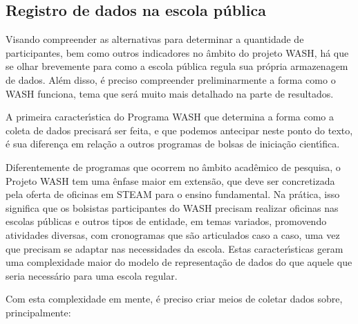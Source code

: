 \documentclass[
12pt,		%
openright,	%
twoside,  %
a4paper,			%
chapter=TITLE,		%
english,			%
french,				%
spanish,			%
brazil				%
]{USPSC-classe/USPSC}
\begin{document}
\subsection[Registro de dados na escola p\'ublica]{Registro de dados na escola p\'ublica}\label{Registro de dados na escola p\'ublica}
Visando compreender as alternativas para determinar a quantidade de participantes, bem como outros indicadores no \^ambito do projeto WASH, h\'a que se olhar brevemente para como a escola p\'ublica regula sua pr\'opria armazenagem de dados. Al\'em disso, \'e preciso compreender preliminarmente a forma como o WASH funciona, tema que ser\'a muito mais detalhado na parte de resultados.










A primeira caracter\'{\i}stica do Programa WASH que determina a forma como a coleta de dados precisar\'a ser feita, e que podemos antecipar neste ponto do texto, \'e sua diferen\c{c}a em rela\c{c}\~ao a outros programas de bolsas de inicia\c{c}\~ao cient\'{\i}fica.










Diferentemente de programas que ocorrem no \^ambito acad\^emico de pesquisa, o Projeto WASH tem uma \^enfase maior em extens\~ao, que deve ser concretizada pela oferta de oficinas em STEAM para o ensino fundamental. Na pr\'atica, isso significa que os bolsistas participantes do WASH precisam realizar oficinas nas escolas p\'ublicas e outros tipos de entidade, em temas variados, promovendo atividades diversas, com cronogramas que s\~ao articulados caso a caso, uma vez que precisam se adaptar nas necessidades da escola. Estas caracter\'{\i}sticas geram uma complexidade maior do modelo de representa\c{c}\~ao de dados do que aquele que seria necess\'ario para uma escola regular.










Com esta complexidade em mente, \'e preciso criar meios de coletar dados sobre, principalmente:
\end{document}
